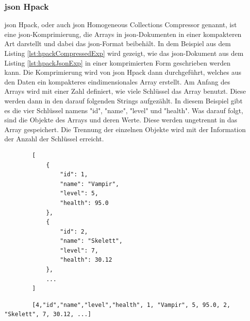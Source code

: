 \subsubsection{\ac{json} Hpack}
\ac{json} Hpack, oder auch \ac{json} Homogeneous Collections Compressor genannt, ist eine \ac{json}-Komprimierung, die Arrays in \ac{json}-Dokumenten in einer kompakteren Art darstellt und dabei das \ac{json}-Format beibehält. In dem Beispiel aus dem Listing \ref{lst:hpackCompressedExp} wird gezeigt, wie das \ac{json}-Dokument aus dem Listing \ref{lst:hpackJsonExp} in einer komprimierten Form geschrieben werden kann. Die Komprimierung wird von \ac{json} Hpack dann durchgeführt, welches aus den Daten ein kompakteres eindimensionales Array erstellt. Am Anfang des Arrays wird mit einer Zahl definiert, wie viele Schlüssel das Array benutzt. Diese werden dann in den darauf folgenden Strings aufgezählt. In diesem Beispiel gibt es die vier Schlüssel namens "id", "name", "level" und "health". Was darauf folgt, sind die Objekte des Arrays und deren Werte. Diese werden ungetrennt in das Array gespeichert. Die Trennung der einzelnen Objekte wird mit der Information der Anzahl der Schlüssel erreicht.
\cite{webreflectionLastVersion}

\begin{listing}[htp]
    \begin{verbatim} 
        [
            {
                "id": 1,
                "name": "Vampir",
                "level": 5,
                "health": 95.0
            },
            {
                "id": 2,
                "name": "Skelett",
                "level": 7,
                "health": 30.12
            },
            ...
        ]                   
    \end{verbatim}
    \caption{}
    \label{lst:hpackJsonExp}
\end{listing}

\begin{listing}[htp]
    \begin{verbatim} 
        [4,"id","name","level","health", 1, "Vampir", 5, 95.0, 2, "Skelett", 7, 30.12, ...]                  
    \end{verbatim}
    \caption{}
    \label{lst:hpackCompressedExp}
\end{listing}

